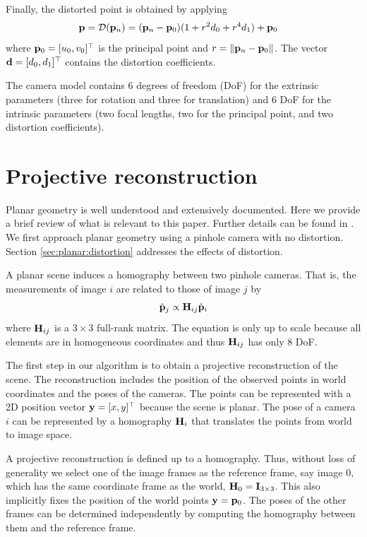 \documentclass[10pt,twocolumn,letterpaper]{article}
\begin{document}
Finally, the distorted point is obtained by applying
%
\begin{align}
\mathbf{p} = \mathcal{D}(\mathbf{p}_n) &= (\mathbf{p}_n-\mathbf{p}_0) (1+r^2 d_0 + r^4 d_1) + \mathbf{p}_0
\label{eq:distortion}
\end{align}
%
where $\mathbf{p}_0=[u_0,v_0]^\top$ is the principal point and $r = \lVert\mathbf{p}_n - \mathbf{p}_0\rVert$. The vector $\mathbf{d}=[d_0,d_1]^\top$ contains the distortion coefficients. 

The camera model contains 6 degrees of freedom (DoF) for the extrinsic parameters (three for rotation and three for translation) and 6 DoF for the intrinsic parameters (two focal lengths, two for the principal point, and two distortion coefficients). 

\section{Projective reconstruction}
\label{sec:projective}

Planar geometry is well understood and extensively documented. Here we provide a brief review of what is relevant to this paper. Further details can be found in \cite{hartley2003}. We first approach planar geometry using a pinhole camera with no distortion. Section \ref{sec:planar:distortion} addresses the effects of distortion.

A planar scene induces a homography between two pinhole cameras. That is, the measurements of image $i$ are related to those of image $j$ by
%
\begin{align}
\hat{\mathbf{p}}_j \propto \mathbf{H}_{ij} \hat{\mathbf{p}}_i 
\label{eq:homography}
\end{align}
%
where $\mathbf{H}_{ij}$ is a $3 \times 3$ full-rank matrix. The equation is only up to scale because all elements are in homogeneous coordinates and thus $\mathbf{H}_{ij}$ has only 8 DoF.

The first step in our algorithm is to obtain a projective reconstruction of the scene. The reconstruction includes the position of the observed points in world coordinates and the poses of the cameras. The points can be represented with a 2D position vector $\mathbf{y}=[x,y]^\top$ because the scene is planar. The pose of a camera $i$ can be represented by a homography $\mathbf{H}_i$ that translates the points from world to image space. 

A projective reconstruction is defined up to a homography. Thus, without loss of generality we select one of the image frames as the reference frame, say image $0$, which has the same coordinate frame as the world, \ie $\mathbf{H}_0 = \mathbf{I}_{3 \times 3}$. This also implicitly fixes the position of the world points $\mathbf{y}=\mathbf{p}_0$. The poses of the other frames can be determined independently by computing the homography between them and the reference frame.
\end{document}
